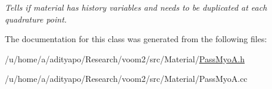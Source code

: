 \begin{DoxyCompactItemize}
\begin{DoxyCompactList}\small\item\em Tells if material has history variables and needs to be duplicated at each quadrature point. \item\end{DoxyCompactList}\end{DoxyCompactItemize}


The documentation for this class was generated from the following files:\begin{DoxyCompactItemize}
\item 
/u/home/a/adityapo/Research/voom2/src/Material/\hyperlink{_pass_myo_a_8h}{PassMyoA.h}\item 
/u/home/a/adityapo/Research/voom2/src/Material/PassMyoA.cc\end{DoxyCompactItemize}
